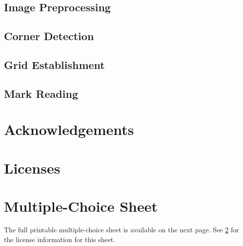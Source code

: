 \documentclass[12pt, letterpaper]{report}
\begin{document}
\subsection{Image Preprocessing}
\subsection{Corner Detection}
\subsection{Grid Establishment}
\subsection{Mark Reading}
\begin{appendices}
\section{Acknowledgements}
\section{Licenses}
\label{sect:licenses}
\section{Multiple-Choice Sheet}
The full printable multiple-choice sheet is available on the next page. See
\ref{sect:licenses} for the license information for this sheet.
 
\end{appendices}
\end{document}

